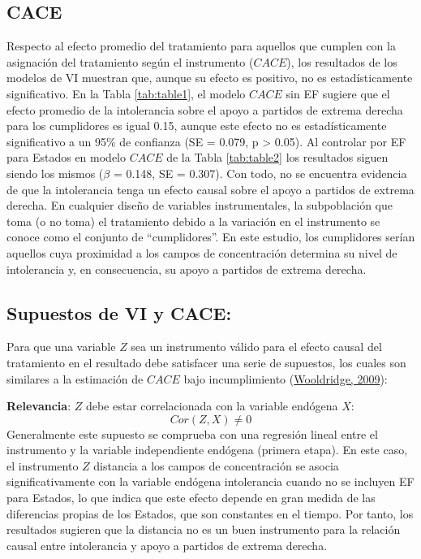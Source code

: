 \documentclass[
  12pt,
  a4paper,
]{article}
\begin{document}
\hypertarget{cace}{%
\subsection{CACE}\label{cace}}

Respecto al efecto promedio del tratamiento para aquellos que cumplen con la asignación del tratamiento según el instrumento (\(CACE\)), los resultados de los modelos de VI muestran que, aunque su efecto es positivo, no es estadísticamente significativo. En la Tabla \ref{tab:table1}, el modelo \(CACE\) sin EF sugiere que el efecto promedio de la intolerancia sobre el apoyo a partidos de extrema derecha para los cumplidores es igual 0.15, aunque este efecto no es estadísticamente significativo a un 95\% de confianza (SE = 0.079, p \textgreater{} 0.05). Al controlar por EF para Estados en modelo \(CACE\) de la Tabla \ref{tab:table2} los resultados siguen siendo los mismos (\(\beta\) = 0.148, SE = 0.307). Con todo, no se encuentra evidencia de que la intolerancia tenga un efecto causal sobre el apoyo a partidos de extrema derecha. En cualquier diseño de variables instrumentales, la subpoblación que toma (o no toma) el tratamiento debido a la variación en el instrumento se conoce como el conjunto de ``cumplidores''. En este estudio, los cumplidores serían aquellos cuya proximidad a los campos de concentración determina su nivel de intolerancia y, en consecuencia, su apoyo a partidos de extrema derecha.

\hypertarget{supuestos-de-vi-y-cace}{%
\subsection{Supuestos de VI y CACE:}\label{supuestos-de-vi-y-cace}}

Para que una variable \(Z\) sea un instrumento válido para el efecto causal del tratamiento en el resultado debe satisfacer una serie de supuestos, los cuales son similares a la estimación de \(CACE\) bajo incumplimiento (\protect\hyperlink{ref-wooldridge_introductory_2009}{Wooldridge, 2009}):

\textbf{Relevancia}: \(Z\) debe estar correlacionada con la variable endógena \(X\): \[Cor(Z,X) \neq 0\] Generalmente este supuesto se comprueba con una regresión lineal entre el instrumento y la variable independiente endógena (primera etapa). En este caso, el instrumento \(Z\) distancia a los campos de concentración se asocia significativamente con la variable endógena intolerancia cuando no se incluyen EF para Estados, lo que indica que este efecto depende en gran medida de las diferencias propias de los Estados, que son constantes en el tiempo. Por tanto, los resultados sugieren que la distancia no es un buen instrumento para la relación causal entre intolerancia y apoyo a partidos de extrema derecha.
\end{document}
